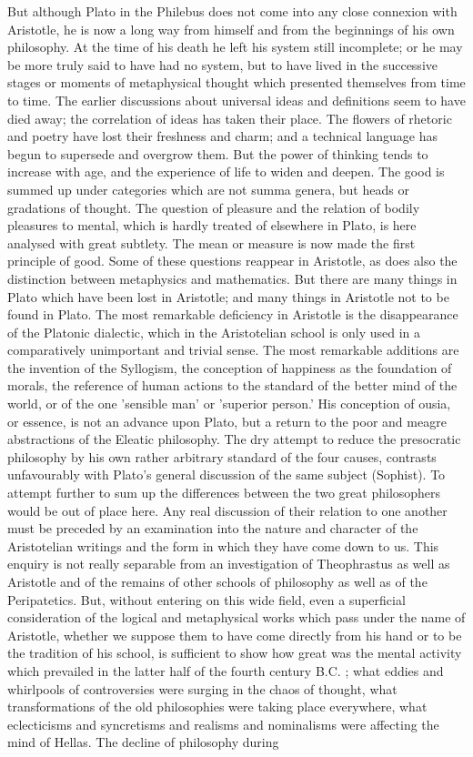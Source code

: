 \documentclass[11pt,letter]{article}
\begin{document}
\par  But although Plato in the Philebus does not come into any close connexion with Aristotle, he is now a long way from himself and from the beginnings of his own philosophy. At the time of his death he left his system still incomplete; or he may be more truly said to have had no system, but to have lived in the successive stages or moments of metaphysical thought which presented themselves from time to time. The earlier discussions about universal ideas and definitions seem to have died away; the correlation of ideas has taken their place. The flowers of rhetoric and poetry have lost their freshness and charm; and a technical language has begun to supersede and overgrow them. But the power of thinking tends to increase with age, and the experience of life to widen and deepen. The good is summed up under categories which are not summa genera, but heads or gradations of thought. The question of pleasure and the relation of bodily pleasures to mental, which is hardly treated of elsewhere in Plato, is here analysed with great subtlety. The mean or measure is now made the first principle of good. Some of these questions reappear in Aristotle, as does also the distinction between metaphysics and mathematics. But there are many things in Plato which have been lost in Aristotle; and many things in Aristotle not to be found in Plato. The most remarkable deficiency in Aristotle is the disappearance of the Platonic dialectic, which in the Aristotelian school is only used in a comparatively unimportant and trivial sense. The most remarkable additions are the invention of the Syllogism, the conception of happiness as the foundation of morals, the reference of human actions to the standard of the better mind of the world, or of the one 'sensible man' or 'superior person.' His conception of ousia, or essence, is not an advance upon Plato, but a return to the poor and meagre abstractions of the Eleatic philosophy. The dry attempt to reduce the presocratic philosophy by his own rather arbitrary standard of the four causes, contrasts unfavourably with Plato's general discussion of the same subject (Sophist). To attempt further to sum up the differences between the two great philosophers would be out of place here. Any real discussion of their relation to one another must be preceded by an examination into the nature and character of the Aristotelian writings and the form in which they have come down to us. This enquiry is not really separable from an investigation of Theophrastus as well as Aristotle and of the remains of other schools of philosophy as well as of the Peripatetics. But, without entering on this wide field, even a superficial consideration of the logical and metaphysical works which pass under the name of Aristotle, whether we suppose them to have come directly from his hand or to be the tradition of his school, is sufficient to show how great was the mental activity which prevailed in the latter half of the fourth century B.C. ; what eddies and whirlpools of controversies were surging in the chaos of thought, what transformations of the old philosophies were taking place everywhere, what eclecticisms and syncretisms and realisms and nominalisms were affecting the mind of Hellas. The decline of philosophy during 
\end{document}
